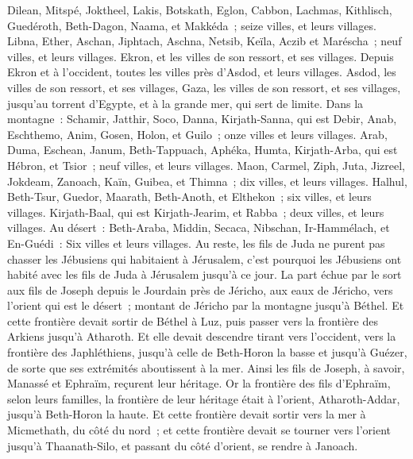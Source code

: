 \begin{multicols}{2}
Dilean, Mitspé, Joktheel,
Lakis, Botskath, Eglon,
Cabbon, Lachmas, Kithlisch,
Guedéroth, Beth-Dagon, Naama, et Makkéda~; seize villes, et leurs villages.
Libna, Ether, Aschan,
Jiphtach, Aschna, Netsib,
Keïla, Aczib et Maréscha~; neuf villes, et leurs villages.
Ekron, et les villes de son ressort, et ses villages.
Depuis Ekron et à l'occident, toutes les villes près d'Asdod, et leurs villages.
Asdod, les villes de son ressort, et ses villages, Gaza, les villes de son ressort, et ses villages, jusqu'au torrent d'Egypte, et à la grande mer, qui sert de limite.
Dans la montagne~: Schamir, Jatthir, Soco,
Danna, Kirjath-Sanna, qui est Debir,
Anab, Eschthemo, Anim,
Gosen, Holon, et Guilo~; onze villes et leurs villages.
Arab, Duma, Eschean,
Janum, Beth-Tappuach, Aphéka,
Humta, Kirjath-Arba, qui est Hébron, et Tsior~; neuf villes, et leurs villages.
Maon, Carmel, Ziph, Juta,
Jizreel, Jokdeam, Zanoach,
Kaïn, Guibea, et Thimna~; dix villes, et leurs villages.
Halhul, Beth-Tsur, Guedor,
Maarath, Beth-Anoth, et Elthekon~; six villes, et leurs villages.
Kirjath-Baal, qui est Kirjath-Jearim, et Rabba~; deux villes, et leurs villages.
Au désert~: Beth-Araba, Middin, Secaca,
Nibschan, Ir-Hammélach, et En-Guédi~: Six villes et leurs villages.
Au reste, les fils de Juda ne purent pas chasser les Jébusiens qui habitaient à Jérusalem, c'est pourquoi les Jébusiens ont habité avec les fils de Juda à Jérusalem jusqu'à ce jour.
\VerseOne{}La part échue par le sort aux fils de Joseph depuis le Jourdain près de Jéricho, aux eaux de Jéricho, vers l'orient qui est le désert~; montant de Jéricho par la montagne jusqu'à Béthel.
Et cette frontière devait sortir de Béthel à Luz, puis passer vers la frontière des Arkiens jusqu'à Atharoth.
Et elle devait descendre tirant vers l'occident, vers la frontière des Japhléthiens, jusqu'à celle de Beth-Horon la basse et jusqu'à Guézer, de sorte que ses extrémités aboutissent à la mer.
Ainsi les fils de Joseph, à savoir, Manassé et Ephraïm, reçurent leur héritage.
Or la frontière des fils d'Ephraïm, selon leurs familles, la frontière de leur héritage était à l'orient, Atharoth-Addar, jusqu'à Beth-Horon la haute.
Et cette frontière devait sortir vers la mer à Micmethath, du côté du nord~; et cette frontière devait se tourner vers l'orient jusqu'à Thaanath-Silo, et passant du côté d'orient, se rendre à Janoach.

\end{multicols}
